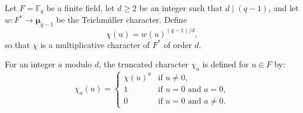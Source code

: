 Let $F = \mathbb{F}_q$ be a finite field, let $d \ge 2$ be an integer such that $d \mid (q-1)$, and let $w: F^* \to \boldsymbol{\mu}_{q-1}$ be the Teichmüller character. Define
$$\chi(u) = w(u)^{(q-1)/d},$$
so that $\chi$ is a multiplicative character of $F^*$ of order $d$.

For an integer $a$ modulo $d$, the truncated character $\chi_a$ is defined for $u \in F$ by:
$$\chi_a(u) = \begin{cases}
\chi(u)^a & \text{if } u \neq 0, \\[4pt]
1 & \text{if } u = 0 \text{ and } a = 0, \\[4pt]
0 & \text{if } u = 0 \text{ and } a \neq 0.
\end{cases}$$
